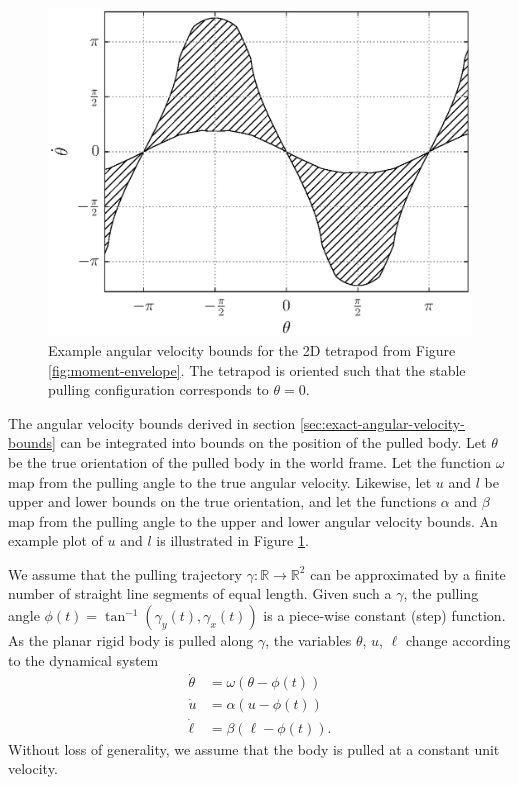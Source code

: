 \documentclass[conference]{IEEEtran}
\begin{document}
\begin{figure}[th]
  \centering
    \includegraphics[width=1\linewidth]{fig/omega_bounds}
    \caption{Example angular velocity bounds for the 2D tetrapod from
      Figure \ref{fig:moment-envelope}. The tetrapod is oriented such
      that the stable pulling configuration corresponds to
      $\theta=0$.}
  \label{fig:omega-bounds}
\end{figure}

The angular velocity bounds derived in section
\ref{sec:exact-angular-velocity-bounds} can be integrated into bounds
on the position of the pulled body.  Let $\theta$ be the true
orientation of the pulled body in the world frame. Let the function
$\omega$ map from the pulling angle to the true angular
velocity. Likewise, let $u$ and $l$ be upper and lower bounds on the
true orientation, and let the functions $\alpha$ and $\beta$ map from
the pulling angle to the upper and lower angular velocity bounds. An
example plot of $u$ and $l$ is illustrated in Figure
\ref{fig:omega-bounds}.

We assume that the pulling trajectory
$\gamma:\mathbb{R}\rightarrow\mathbb{R}^2$ can be approximated by a
finite number of straight line segments of equal length. Given such a
$\gamma$, the pulling angle
$\phi(t) = \tan^{-1}(\gamma_y(t),\gamma_x(t))$ is a piece-wise
constant (step) function. As the planar rigid body is pulled along
$\gamma$, the variables $\theta$, $u$, $\ell$ change according to the
dynamical system
\begin{align}
  \dot{\theta} &= \omega(\theta - \phi(t))\\
  \dot{u} &=  \alpha(u - \phi(t)) \label{eq:u-ode}\\ 
  \dot{\ell} &=  \beta(\ell - \phi(t)). 
\end{align}
Without loss of generality, we assume that the body is pulled at a
constant unit velocity.
\end{document}
